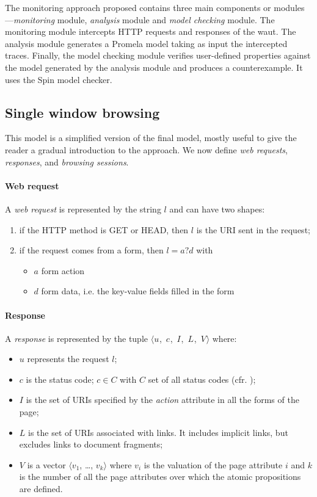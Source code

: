 \documentclass[a4paper,10pt]{article}
\newcommand{\res}[1][]{
  \ifthenelse{\equal{#1}{}}{\mbox{$\langle u$, $c$, $I$, $L$, $V\rangle$}}
  {\mbox{$\langle u_{#1}$, $c_{#1}$, $I_{#1}$, $L_{#1}$, $V_{#1}\rangle$}}
}
\theoremstyle{plain} %
\theoremstyle{definition}
\theoremstyle{remark}
\begin{document}
The monitoring approach proposed contains three main components or modules---\textit{monitoring} module, \textit{analysis} module and \textit{model checking} module. The monitoring module intercepts HTTP requests and responses of the \gls{waut}. The analysis module generates a Promela model taking as input the intercepted traces. Finally, the model checking module verifies user-defined properties against the model generated by the analysis module and produces a counterexample. It uses the Spin model checker.

\subsection{Single window browsing}
\label{single-window-browsing}

This model is a simplified version of the final model, mostly useful to give the reader a gradual introduction to the approach. We now define \emph{web requests}, \emph{responses}, and \emph{browsing sessions}.

\paragraph{Web request}
A \emph{web request} is represented by the string $l$ and can have two shapes:

\begin{enumerate}
  \item if the HTTP method is GET or HEAD, then $l$ is the URI sent in the request;
  \item if the request comes from a form, then $l = a?d$ with
    \begin{itemize}
      \item $a$ form action
      \item $d$ form data, i.e. the key-value fields filled in the form
    \end{itemize}
\end{enumerate}

\paragraph{Response}
A \emph{response} is represented by the tuple \res where:

\begin{itemize}
  \item $u$ represents the request $l$;
  \item $c$ is the status code; $c \in C$ with $C$ set of all status codes (cfr. \cite[\S 15]{Fielding2022});
  \item $I$ is the set of URIs specified by the \textit{action} attribute in all the forms of the page;
  \item $L$ is the set of URIs associated with links. It includes implicit links, but excludes links to document fragments;
  \item $V$ is a vector $\langle$$v_1$, \dots, $v_k$$\rangle$ where $v_i$ is the valuation of the page attribute $i$ and $k$ is the number of all the page attributes over which the atomic propositions are defined.
\end{itemize}
\end{document}
